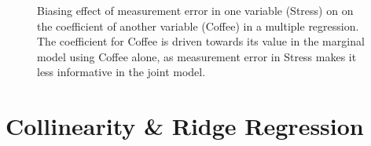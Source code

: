 \documentclass[
  letterpaper,
  10pt,
  krantz2]{krantz}
\begin{document}
{\begin{figure}


\caption{\label{fig-coffee-measerr}Biasing effect of measurement error
in one variable (Stress) on on the coefficient of another variable
(Coffee) in a multiple regression. The coefficient for Coffee is driven
towards its value in the marginal model using Coffee alone, as
measurement error in Stress makes it less informative in the joint
model.}

\end{figure}%


\chapter{Collinearity \& Ridge Regression}\label{sec-collin}

\renewcommand*{\vec}[1]{\mathbf{#1}}
\newcommand{\trans}{^\mathsf{T}}
\newcommand*{\mat}[1]{\mathbf{#1}}
\newcommand*{\diag}[1]{\mathrm{diag}\, #1}

\renewcommand*{\det}[1]{\mathrm{det}(#1)}
\newcommand*{\rank}[1]{\mathrm{rank} (\mathbf{#1})}
\newcommand*{\trace}[1]{\mathrm{tr} (\mathbf{#1})}
\newcommand*{\dev}[1]{(#1 - \bar{#1})}
\newcommand*{\inv}[1]{\mat{#1}^{-1}}
\newcommand*{\half}[1]{\mat{#1}^{1/2}}
\newcommand*{\invhalf}[1]{\mat{#1}^{-1/2}}
\newcommand*{\nvec}[2]{{#1}_{1}, {#1}_{2},\ldots,{#1}_{#2}}
\newcommand*{\Beta}{\boldsymbol{B}}
\newcommand*{\Epsilon}{\boldsymbol{\Large\varepsilon}}
\newcommand*{\period}{\:\: .}
\newcommand*{\comma}{\:\: ,}
\newcommand*{\given}{\, | \,}
\newcommand*{\Real}[1]{\mathbb{R}^{#1}}
\newcommand*{\degree}[1]{{#1}^{\circ}}

}
\end{document}
